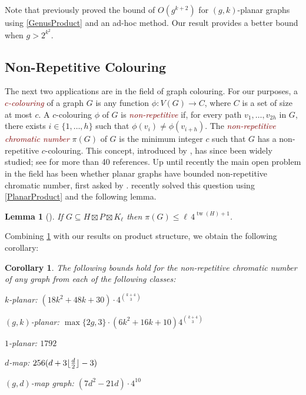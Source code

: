 \documentclass{patmorin}
\theoremstyle{plain}
\newtheorem{lem}[thm]{Lemma}
\newtheorem{cor}[thm]{Corollary}
\theoremstyle{definition}
\newcommand{\defin}[1]{\textcolor{Maroon}{\emph{#1}}}
\DeclareMathOperator{\tw}{tw}
\DeclarePairedDelimiter{\floor}{\lfloor}{\rfloor}
\renewcommand{\le}{\leqslant}
\begin{document}
Note that \citet{DJMMUW20} previously proved the bound of
$O(g^{k+2})$ for $(g,k)$-planar graphs using \cref{GenusProduct} and an ad-hoc method. Our result provides a better bound when $g>2^{k^2}$.

\subsection{Non-Repetitive Colouring}

The next two applications are in the field of graph colouring. For our purposes, a \defin{$c$-colouring} of a graph $G$ is any function $\phi\colon V(G)\to C$, where $C$ is a set of size at most $c$.
A $c$-colouring $\phi$ of $G$ is \defin{non-repetitive} if, for every path $v_1,\ldots,v_{2h}$ in $G$, there exists $i\in\{1,\ldots,h\}$ such that $\phi(v_i)\neq\phi(v_{i+h})$.  The \defin{non-repetitive chromatic number} $\pi(G)$ of $G$ is the minimum integer $c$ such that $G$ has a non-repetitive $c$-colouring. This concept, introduced by \citet{AGHR-RSA02}, has since been widely studied; see \citep{dujmovic.esperet.ea:planar} for more than 40 references. Up until recently the main open problem in the field has been whether planar graphs have bounded non-repetitive chromatic number, first asked by \citet{AGHR-RSA02}. \citet{dujmovic.esperet.ea:planar} recently solved this question using \cref{PlanarProduct} and the following lemma.

\begin{lem}[\citep{dujmovic.esperet.ea:planar}]
\label{non-repetitive}
If $G\subseteq H\boxtimes P \boxtimes K_\ell$ then $\pi(G)\le \ell\, 4^{\tw(H)+1}$.
\end{lem}


Combining \cref{non-repetitive} with our results on product structure, we obtain the following corollary:
\begin{cor}\label{non-repetitive_cor}
  The following bounds hold for the non-repetitive chromatic number of any graph from each of the following classes:
  \begin{compactitem}
    \item $k$-planar: $(18k^2+48k+30)\cdot 4^{\binom{k+4}{3}}$
    \item $(g,k)$-planar: $\max\{2g,3\}\cdot(6k^2+16k+10) 4^{\binom{k+4}{3}}$
    \item $1$-planar: $1792$
    \item $d$-map: $256(d+3\floor{\frac{d}{2}}-3)$
    \item $(g,d)$-map graph: $(7d^2-21d)\cdot 4^{10}$
  \end{compactitem}
\end{cor}
\end{document}
